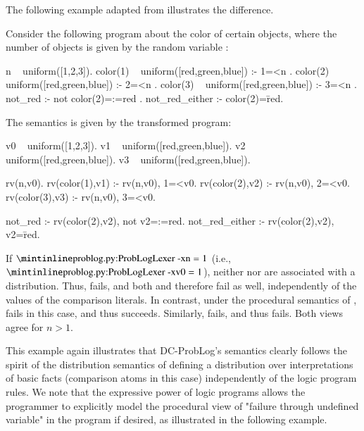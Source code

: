 The following example adapted from \cite{nitti2016probabilistic} illustrates the difference.
\begin{example}\label{ex:dc-vs-dcproblog}
	Consider the following program about the color of certain objects, where the number of objects is given by the random variable :
	\begin{problog}
n ~ uniform([1,2,3]).
color(1) ~ uniform([red,green,blue]) :- 1=<n .
color(2) ~ uniform([red,green,blue]) :- 2=<n .
color(3) ~ uniform([red,green,blue]) :- 3=<n .
not_red :- not color(2)=:=red .
not_red_either :- color(2)=\=red.
	\end{problog}
	The \dcproblogsty semantics is given by the transformed program:
	\begin{problog}
v0 ~ uniform([1,2,3]).
v1 ~ uniform([red,green,blue]).
v2 ~ uniform([red,green,blue]).
v3 ~ uniform([red,green,blue]).

rv(n,v0).
rv(color(1),v1) :- rv(n,v0), 1=<v0.
rv(color(2),v2) :- rv(n,v0), 2=<v0.
rv(color(3),v3) :- rv(n,v0), 3=<v0.

not_red :- rv(color(2),v2), not v2=:=red.
not_red_either :- rv(color(2),v2), v2=\=red.
	\end{problog}
	If $\mathprobloginline{n}=1$ (i.e., $\mathprobloginline{v0}=1$), neither  nor  are associated with a distribution.  Thus,  fails, and both  and  therefore fail as well, independently of the values of the comparison literals.
	In contrast, under 
	the procedural semantics of \cite{nitti2016probabilistic},  fails in this case, and  thus succeeds. Similarly,  fails, and   thus fails.  
	Both views agree for $n>1$.
\end{example}

This example again illustrates that DC-ProbLog's semantics clearly follows the spirit of the distribution   semantics of defining a distribution over interpretations of basic facts (comparison atoms in this case) independently of the logic program rules. 
We note that the expressive power of logic programs allows the programmer to explicitly model the procedural view of "failure through undefined variable" in the program if desired, as illustrated in the following example. 

